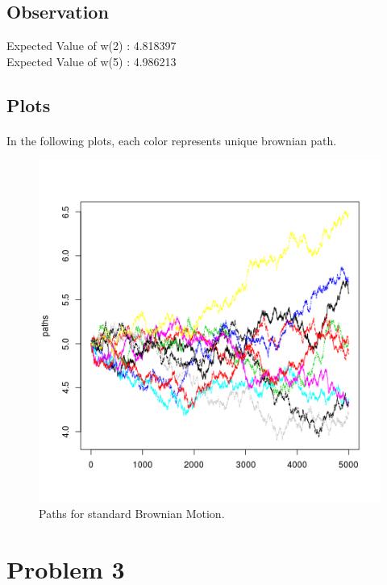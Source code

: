 \documentclass{article}
\begin{document}
	
		\subsection{Observation}

	
Expected Value of w(2) :  4.818397 \\
Expected Value of w(5) :  4.986213	\\

\clearpage
	
		\subsection{Plots}
	
		\paragraph{}
		In the following plots, each color represents unique brownian path.
		
			\begin{figure}[!ht]
  			\includegraphics[width=\linewidth]{pic/que2.png}
 			 \caption{Paths for standard Brownian Motion.}
  			\label{fig:hist1_1}
		\end{figure}
		
		\clearpage
		
	\section{Problem 3}
\end{document}
